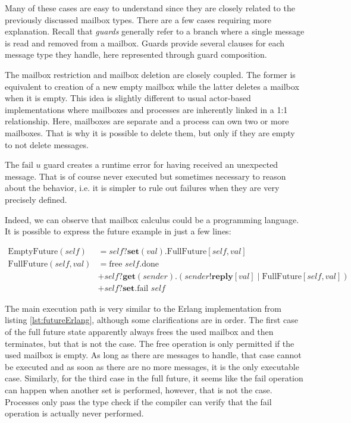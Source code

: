 Many of these cases are easy to understand since they are closely related to the previously discussed mailbox types. There are a few cases requiring more explanation. Recall that \textit{guards} generally refer to a branch where a single message is read and removed from a mailbox. Guards provide several clauses for each message type they handle, here represented through guard composition.

The mailbox restriction and mailbox deletion are closely coupled. The former is equivalent to creation of a new empty mailbox while the latter deletes a mailbox when it is empty. This idea is slightly different to usual actor-based implementations where mailboxes and processes are inherently linked in a 1:1 relationship. Here, mailboxes are separate and a process can own two or more mailboxes. That is why it is possible to delete them, but only if they are empty to not delete messages.

The $\text{fail }u$ guard creates a runtime error for having received an unexpected message. That is of course never executed but sometimes necessary to reason about the behavior, i.e. it is simpler to rule out failures when they are very precisely defined.

Indeed, we can observe that mailbox calculus could be a programming language. It is possible to express the future example in just a few lines:

\begin{align*}
    \text{EmptyFuture}(\textit{self}) &= \textit{self}?\textbf{set}(val).\text{FullFuture}[\textit{self}, val] \\
    \text{FullFuture}(\textit{self}, val) &= \text{free }\textit{self}.\text{done} \\
    &+ \textit{self}?\textbf{get}(sender).(sender!\textbf{reply}[val] \mid \text{FullFuture}[\textit{self}, val])\\
    &+\textit{self}?\textbf{set}.\text{fail }\textit{self}
\end{align*}

The main execution path is very similar to the Erlang implementation from listing \ref{lst:futureErlang}, although some clarifications are in order. The first case of the full future state apparently always frees the used mailbox and then terminates, but that is not the case. The free operation is only permitted if the used mailbox is empty. As long as there are messages to handle, that case cannot be executed and as soon as there are no more messages, it is the only executable case. Similarly, for the third case in the full future, it seems like the fail operation can happen when another set is performed, however, that is not the case. Processes only pass the type check if the compiler can verify that the fail operation is actually never performed.

